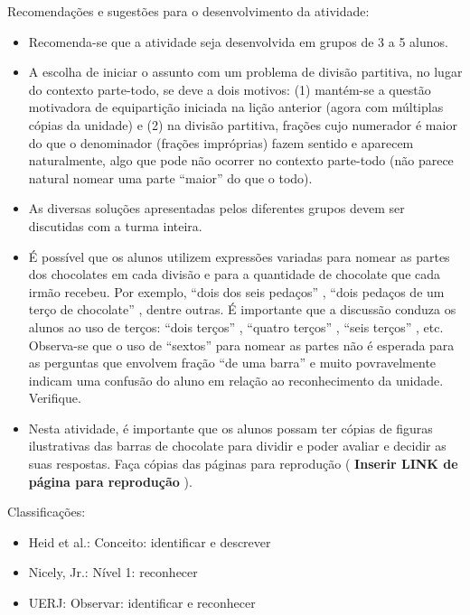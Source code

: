 \documentclass[oneside]{book}
\begin{document}
\begin{multicols}{2}
  Recomendações e sugestões para o desenvolvimento da atividade:
\begin{itemize} %
    \item       Recomenda-se que a atividade seja desenvolvida em grupos de 3 a 5 alunos.
    \item       A escolha de iniciar o assunto com um problema de divisão partitiva, no lugar do contexto parte-todo, se deve a dois motivos: (1) mantém-se a questão motivadora de equipartição iniciada na lição anterior (agora com múltiplas cópias da unidade) e (2) na divisão partitiva, frações cujo numerador é maior do que o denominador (frações impróprias) fazem sentido e aparecem naturalmente, algo que pode não ocorrer no contexto parte-todo (não parece natural nomear uma parte       ``maior''       do que o todo).
    \item       As diversas soluções apresentadas pelos diferentes grupos devem ser discutidas com a turma inteira.
    \item       É possível que os alunos utilizem expressões variadas para nomear as partes dos chocolates em cada divisão e para a quantidade de chocolate que cada irmão recebeu. Por exemplo,       ``dois dos seis pedaços''      ,       ``dois pedaços de um terço de chocolate''      , dentre outras. É importante que a discussão conduza os alunos ao uso de terços:       ``dois terços''      ,       ``quatro terços''      ,       ``seis terços''      , etc. Observa-se que o uso de       ``sextos''       para nomear as partes não é esperada para as perguntas que envolvem fração       ``de uma barra''       e muito povravelmente indicam uma confusão do aluno em relação ao reconhecimento da unidade. Verifique.
    \item       Nesta atividade, é importante que os alunos possam ter cópias de figuras ilustrativas das barras de chocolate para dividir e poder avaliar e decidir as suas respostas. Faça cópias das páginas para reprodução (      {\bf Inserir LINK de página para reprodução}      ).
\end{itemize} %


  Classificações:
\begin{itemize} %
    \item       Heid et al.: Conceito: identificar e descrever
    \item       Nicely, Jr.: Nível 1: reconhecer
    \item       UERJ: Observar: identificar e reconhecer
\end{itemize} %



\end{multicols}
\end{document}
